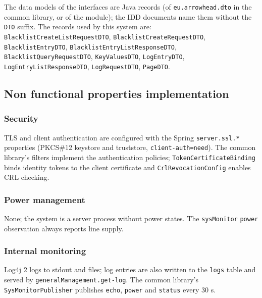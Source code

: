 \documentclass[a4paper]{arrowhead}
\begin{document}
The data models of the interfaces are Java records (of \texttt{eu.arrowhead.dto} in the common library, or of the module); the IDD documents name them without the \texttt{DTO} suffix. The records used by this system are: \texttt{Blacklist\allowbreak{}Create\allowbreak{}List\allowbreak{}Request\allowbreak{}DTO}, \texttt{Blacklist\allowbreak{}Create\allowbreak{}Request\allowbreak{}DTO}, \texttt{BlacklistEntryDTO}, \texttt{Blacklist\allowbreak{}Entry\allowbreak{}List\allowbreak{}Response\allowbreak{}DTO}, \texttt{Blacklist\allowbreak{}Query\allowbreak{}Request\allowbreak{}DTO}, \texttt{KeyValuesDTO}, \texttt{LogEntryDTO}, \texttt{Log\allowbreak{}Entry\allowbreak{}List\allowbreak{}Response\allowbreak{}DTO}, \texttt{LogRequestDTO}, \texttt{PageDTO}.

\subsection{Non functional properties implementation}

\subsubsection{Security}

TLS and client authentication are configured with the Spring \texttt{server.\allowbreak{}ssl.\allowbreak{}*} properties (PKCS\#12 keystore and truststore, \texttt{client-\allowbreak{}auth=\allowbreak{}need}). The common library's filters implement the authentication policies; \texttt{Token\allowbreak{}Certificate\allowbreak{}Binding} binds identity tokens to the client certificate and \texttt{Crl\allowbreak{}Revocation\allowbreak{}Config} enables CRL checking.

\subsubsection{Power management}

None; the system is a server process without power states. The \texttt{sysMonitor} \texttt{power} observation always reports line supply.

\subsubsection{Internal monitoring}

Log4j 2 logs to stdout and files; log entries are also written to the \texttt{logs} table and served by \texttt{general\allowbreak{}Management.\allowbreak{}get-\allowbreak{}log}. The common library's \texttt{Sys\allowbreak{}Monitor\allowbreak{}Publisher} publishes \texttt{echo}, \texttt{power} and \texttt{status} every 30 s.
\end{document}
